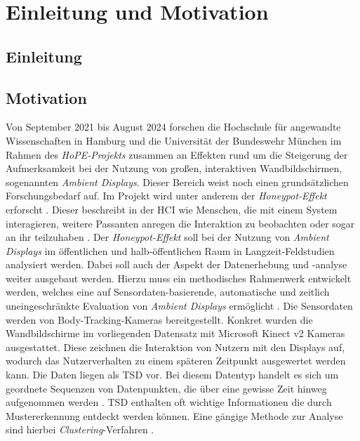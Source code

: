 \chapter{Einleitung und Motivation}
\label{chapter1}

\section{Einleitung}
\label{1-Einleitung}


\section{Motivation}
\label{1-Motivation}
Von September 2021 bis August 2024 forschen die Hochschule für angewandte Wissenschaften in Hamburg
und die Universität der Bundeswehr München im Rahmen des \emph{HoPE-Projekts} zusammen an Effekten
rund um die Steigerung der Aufmerksamkeit bei der Nutzung von großen, interaktiven Wandbildschirmen,
sogenannten \emph{Ambient Displays}.
Dieser Bereich weist noch einen grundsätzlichen Forschungsbedarf auf.
Im Projekt wird unter anderem der \emph{Honeypot-Effekt} erforscht \citep{unibw_honeypot-effekt_2021}.
Dieser beschreibt in der \ac{HCI} wie Menschen, die mit einem System interagieren,
weitere Passanten anregen die Interaktion zu beobachten oder sogar an ihr teilzuhaben \citep{wouters_uncovering_2016}.
Der \emph{Honeypot-Effekt} soll bei der Nutzung von \emph{Ambient Displays} im öffentlichen
und halb-öffentlichen Raum in Langzeit-Feldstudien analysiert werden.
Dabei soll auch der Aspekt der Datenerhebung und -analyse weiter ausgebaut werden.
Hierzu muss ein methodisches Rahmenwerk entwickelt werden, welches eine auf Sensordaten-basierende,
automatische und zeitlich uneingeschränkte Evaluation von \emph{Ambient Displays} ermöglicht \citep{unibw_honeypot-effekt_2021}.
Die Sensordaten werden von Body-Tracking-Kameras bereitgestellt.
Konkret wurden die Wandbildschirme im vorliegenden Datensatz mit Microsoft Kinect v2 Kameras ausgestattet.
Diese zeichnen die Interaktion von Nutzern mit den Displays auf,
wodurch das Nutzerverhalten zu einem späteren Zeitpunkt ausgewertet werden kann.
Die Daten liegen als \ac{TSD} vor.
Bei diesem Datentyp handelt es sich um geordnete Sequenzen von Datenpunkten,
die über eine gewisse Zeit hinweg aufgenommen werden \citep{ali_clustering_2019}.
\ac{TSD} enthalten oft wichtige Informationen die durch Mustererkennung entdeckt werden können.
Eine gängige Methode zur Analyse sind hierbei \emph{Clustering}-Verfahren \citep{aghabozorgi_time-series_2015}.
